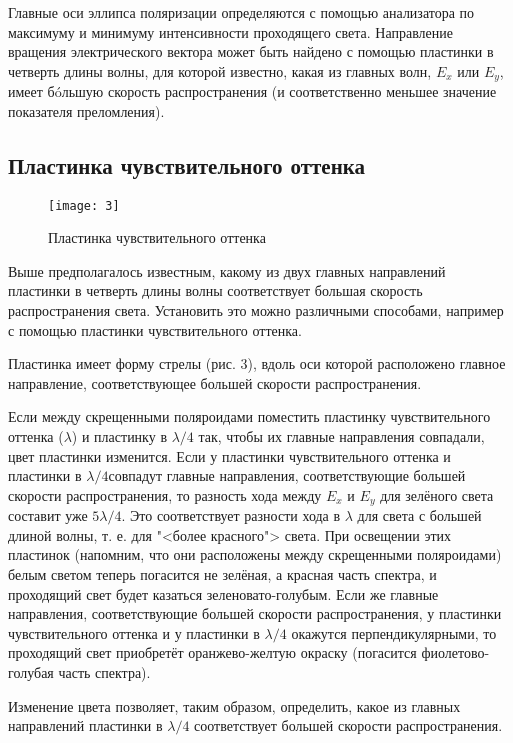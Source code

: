 Главные оси эллипса поляризации определяются с помощью анализатора по максимуму и минимуму интенсивности проходящего света.
Направление вращения электрического вектора может быть найдено
с помощью пластинки в четверть длины волны, для которой известно,
какая из главных волн, $ E_x $ или $ E_y $, имеет б\'{o}льшую скорость распространения (и соответственно меньшее значение показателя преломления).


\subsection{Пластинка чувствительного оттенка}

\begin{wrapfigure}{l}{0.35\linewidth}
	\texttt{[image: 3]}
	\caption{Пластинка
		чувствительного
		оттенка}
	\label{ris 3}
\end{wrapfigure}

Выше предполагалось известным, какому из двух главных направлений пластинки в четверть длины волны соответствует большая скорость распространения света.
Установить это можно различными способами, например с помощью
пластинки чувствительного оттенка.

Пластинка имеет форму стрелы (рис. 3), вдоль оси которой расположено главное направление, соответствующее большей скорости распространения.

Если между скрещенными поляроидами поместить пластинку чувствительного оттенка
($ \lambda $) и пластинку в $ \lambda/4 $ так, чтобы их главные
направления совпадали, цвет пластинки изменится. Если у пластинки чувствительного оттенка и пластинки в $ \lambda/4  $совпадут главные направления, соответствующие большей скорости распространения, то разность хода между $ E_x $ и $ E_y $ для зелёного света составит уже $ 5\lambda/4 $. Это соответствует разности хода в $ \lambda $ для света с большей длиной волны, т. е. для "<более красного"> света. При освещении
этих пластинок (напомним, что они расположены между скрещенными поляроидами) белым светом теперь погасится не зелёная, а красная
часть спектра, и проходящий свет будет казаться зеленовато-голубым.
Если же главные направления, соответствующие большей скорости распространения, у пластинки чувствительного оттенка и у пластинки
в $ \lambda/4 $ окажутся перпендикулярными, то проходящий свет приобретёт
оранжево-желтую окраску (погасится фиолетово-голубая часть спектра).

Изменение цвета позволяет, таким образом, определить, какое из
главных направлений пластинки в $ \lambda/4 $ соответствует большей скорости
распространения.

